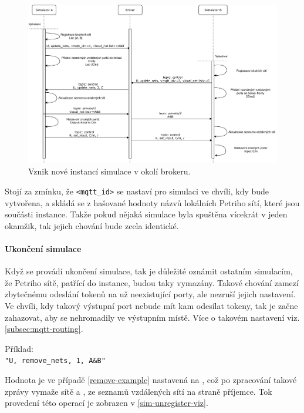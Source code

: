 \begin{figure}[hbt]
 \centering
 \includegraphics[width=1\textwidth]{obrazky-figures/sim-register.pdf}
 \caption{Vznik nové instancí simulace v okolí brokeru.}
 \label{sim-register-viz}
\end{figure}

Stojí za zmínku, že \texttt{<mqtt\_id>} se nastaví pro simulaci ve chvíli, kdy bude vytvořena, a skládá se z hašované hodnoty názvů lokálních Petriho sítí, které jsou součásti instance. Takže pokud nějaká simulace byla spuštěna vícekrát v jeden okamžik, tak jejich chování bude zcela identické.

\paragraph{Ukončení simulace}

Když se provádí ukončení simulace, tak je důležité oznámit ostatním simulacím, že Petriho sítě, patřící do instance, budou taky vymazány. Takové chování zamezí zbytečnému odeslání tokenů na už neexistující porty, ale nezruší jejich nastavení. Ve chvíli, kdy takový výstupní port nebude mít kam odesílat tokeny, tak je začne zahazovat, aby se nehromadily ve výstupním místě. Více o takovém nastavení viz. \ref{subsec:mqtt-routing}.

\begin{tabbing}
  \label{remove-example}
  Příklad: \= \\
  \>\texttt{"U, remove\_nets, 1, A\&B"}
\end{tabbing}

Hodnota  je ve případě \ref{remove-example} nastavená na , což po zpracování takové zprávy vymaže sítě  a , ze seznamů vzdálených sítí na straně příjemce. Tok provedení této operací je zobrazen v \ref{sim-unregister-viz}.

